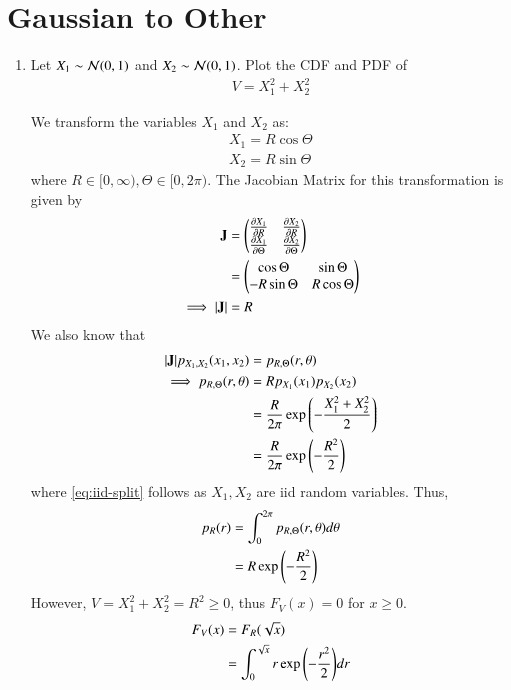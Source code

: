 \documentclass[journal,12pt,twocolumn]{IEEEtran}
\renewcommand\thesection{\arabic{section}}
\begin{document}
\section{Gaussian to Other}
\begin{enumerate}[label=\thesection.\arabic*
,ref=\thesection.\theenumi]
\item Let $X_1 \sim \mathcal{N}(0, 1)$ and $X_2 \sim \mathcal{N}(0, 1)$. Plot the CDF and PDF of
	\begin{align}
		V = X_1^2 + X_2^2
	\end{align}

\solution
We transform the variables $X_1$ and $X_2$ as:
		\begin{align}
			X_1 = R\cos{\Theta} \\
			X_2 = R\sin{\Theta}
		\end{align}
where $R \in [0, \infty), \Theta \in [0, 2\pi)$. The Jacobian Matrix for this transformation is given by
		\begin{align}
			\mathbf{J} &= \begin{pmatrix}\frac{\partial X_1}{\partial R} & \frac{\partial X_2}{\partial R} \\
							 \frac{\partial X_1}{\partial \Theta} & \frac{\partial X_2}{\partial \Theta}\end{pmatrix} \\
					&= \begin{pmatrix}\cos{\Theta} & \sin{\Theta} \\
							  -R\sin{\Theta} & R\cos{\Theta}\end{pmatrix} \\
			\implies |\mathbf{J}| &= R
			\label{eq:Jacobian}
		\end{align}
We also know that
		\begin{align}
			|\mathbf{J}|p_{X_1, X_2}(x_1, x_2) &= p_{R, \Theta}(r, \theta) \\
			\implies p_{R, \Theta}(r, \theta) &= Rp_{X_1}(x_1)p_{X_2}(x_2) \label{eq:iid-split} \\
			&= \frac{R}{2\pi}\exp{\ensuremath{\left(-\frac{X_1^2 + X_2^2}{2}\right)}} \\
			&= \frac{R}{2\pi}\exp{\ensuremath{\left(-\frac{R^2}{2}\right)}}
			\label{eq:joint}
		\end{align}
where \eqref{eq:iid-split} follows as $X_1, X_2$ are iid random variables. Thus,
		\begin{align}
			p_R(r) &= \int_{0}^{2\pi}p_{R, \Theta}(r, \theta)d\theta \\
			&= R\exp{\ensuremath{\left(-\frac{R^2}{2}\right)}}
		\end{align}
However, $V = X_1^2 + X_2^2 = R^2 \geq 0$, thus $F_V(x) = 0$ for $x \geq 0$.
		\begin{align}
			F_V(x) &= F_R(\sqrt{x}) \\ 
			&= \int_{0}^{\sqrt{x}}r\exp{\brak{-\frac{r^2}{2}}}dr \\

\end{align}
\end{enumerate}
\end{document}
